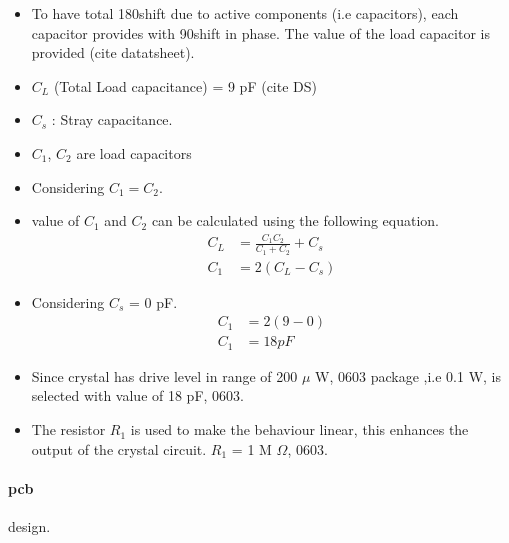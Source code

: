 \begin{enumerate}
\begin{itemize}
	\item To have total 180\textdegree 	 shift due to active components (i.e capacitors), each capacitor provides with 90\textdegree  shift in phase. The value of the load capacitor is provided (cite datatsheet). 
	\item $C_{L}$ (Total Load capacitance) = 9 pF (cite DS)
	\item $C_{s}$ : Stray capacitance.
	\item $C_{1}$, $C_{2}$ are load capacitors
	\item Considering $C_{1} = C_{2}$. 
	\item value of $C_{1}$ and $C_{2}$ can be calculated using the following equation.
					\begin{align}				
						C_{L} &= {\frac{C_{1}C_{2} }{C_{1} + C_{2}}} + C_{s}\\
						C_{1} &= 2(C_{L} - C_{s})			
					\end{align}
	\item Considering $C_{s}$ = 0 pF.
					\begin{align}
						C_{1} &= 2(9 - 0)\\
						C_{1} &= 18 pF
					\end{align}
	\item Since crystal has drive level in range of 200 $\mu$ W, 0603 package ,i.e 0.1 W, is selected with value of 18 pF, 0603.
	\item The resistor $R_{1}$ is used to make the behaviour linear, this enhances the output of the crystal circuit. $R_{1}$ = 1 M $\Omega$, 0603.
				\end{itemize}
		
		\end{enumerate}		
	\paragraph{\gls{pcb} } design.
	

\cite{AVR042}

